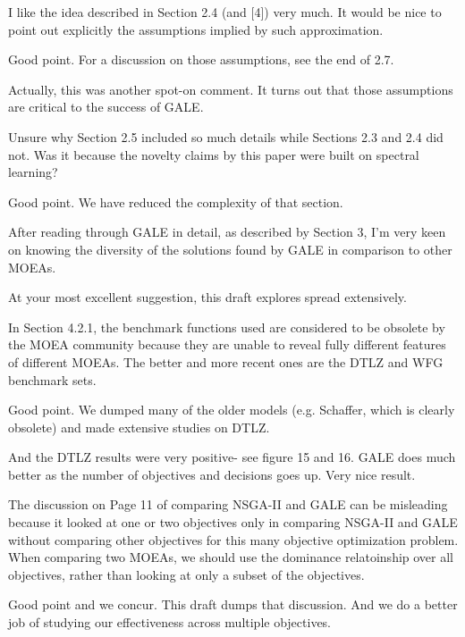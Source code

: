 \documentclass[10pt,journal,compsoc]{IEEEtran}
\newenvironment{changed}{\par\color{MyDarkBlue}}{\par}
\begin{document}
I like the idea described in Section 2.4 (and [4]) very much.
It would be nice to point out explicitly the assumptions implied by such
approximation.


\begin{changed}
Good point. For a discussion on those assumptions,
see the end of {\textsection}2.7.

Actually, this was another spot-on comment. It turns out that those
assumptions are critical to the success of GALE.
\end{changed}

Unsure why Section 2.5 included so much details while Sections 2.3 and
2.4 did not. Was it because the novelty claims by this paper were built on
spectral learning?

\begin{changed}
Good point. We have reduced the complexity of that section.
\end{changed}


After reading through GALE in detail, as described by Section 3, I'm
very keen on knowing the diversity of the solutions found by GALE in
comparison to other MOEAs.


\begin{changed}
At your most excellent suggestion, this draft explores spread extensively.
\end{changed}

In Section 4.2.1, the benchmark functions used are considered to be
obsolete by the MOEA community because they are unable to reveal fully
different features of different MOEAs. The better and more recent ones are
the DTLZ and WFG benchmark sets.


\begin{changed}
Good point. We dumped many of the older models (e.g. Schaffer, which is clearly
obsolete) and made extensive studies on DTLZ. 

And the DTLZ results were very positive- see figure 15 and 16. GALE does much
better as the number of objectives and decisions goes up. Very nice result.
\end{changed}

The discussion on Page 11 of comparing NSGA-II and GALE can be misleading
because it looked at one or two objectives only in comparing NSGA-II and
GALE without comparing other objectives for this many objective
optimization problem. When comparing two MOEAs, we should use the dominance
relatoinship over all objectives, rather than looking at only a subset of
the objectives.
\begin{changed}
Good point and we concur. This draft dumps that discussion. And
we do a better job of studying our effectiveness across multiple objectives.
\end{changed}
\end{document}
